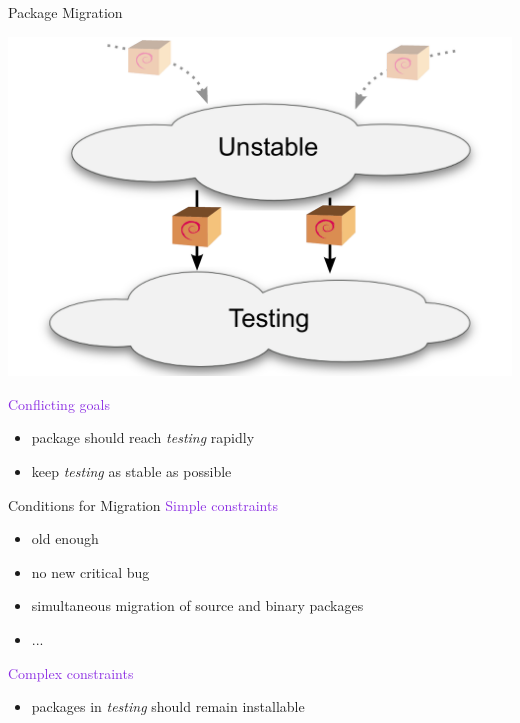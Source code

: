 \documentclass[xcolor={dvipsnames}]{beamer}
\newcommand{\EEE}[1]{\textcolor{BlueViolet}{#1}}
\begin{document}
\begin{frame}{Package Migration}

\begin{center}
\includegraphics[width=0.7\linewidth]{migration}
\end{center}

\vspace{-1em}
\EEE{Conflicting goals}
\begin{itemize}
\item package should reach \textit{testing} rapidly
\item keep \textit{testing} as stable as possible
\end{itemize}

\end{frame}

\begin{frame}{Conditions for Migration}
\EEE{Simple constraints} %
\begin{itemize}
\item old enough
\item no new critical bug
\item simultaneous migration of source and binary packages
\item ...
\end{itemize}

\vspace{1em}

\EEE{Complex constraints}
\begin{itemize}
\item packages in \textit{testing} should remain installable
\end{itemize}
\end{frame}
\end{document}
